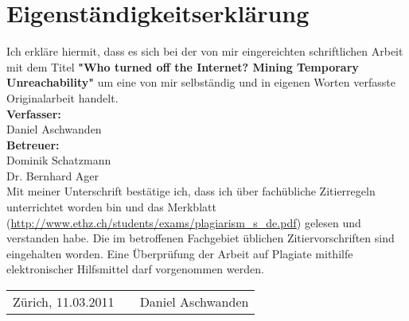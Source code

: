 

\chapter*{Eigenständigkeitserklärung} Ich erkläre hiermit, dass es sich bei
der von mir eingereichten schriftlichen Arbeit mit dem Titel
\textbf{"Who turned off the Internet? Mining Temporary Unreachability"} um eine von mir selbständig und in eigenen Worten verfasste
Originalarbeit handelt.\\

\vspace{5mm} \textbf{Verfasser:}\\
Daniel Aschwanden\\

\vspace{5mm} \textbf{Betreuer:}\\
Dominik Schatzmann\\
Dr. Bernhard Ager\\

\vspace{5mm} Mit meiner Unterschrift bestätige ich, dass ich über fachübliche
Zitierregeln unterrichtet worden bin und das Merkblatt
(\url{http://www.ethz.ch/students/exams/plagiarism_s_de.pdf}) gelesen und
verstanden habe. Die im betroffenen Fachgebiet üblichen Zitiervorschriften sind
eingehalten worden.
Eine Überprüfung der Arbeit auf Plagiate mithilfe elektronischer Hilfsmittel
darf vorgenommen werden.\\

\vspace{15mm} 
\begin{tabular}
	{l p{} r} Zürich, 11.03.2011 &&
	Daniel Aschwanden \\
\end{tabular}

\vfil